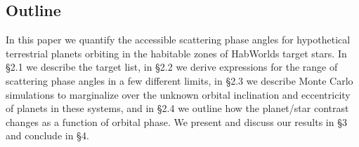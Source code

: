 \documentclass[
    usenatbib,
]{mnras}
\begin{document}




\subsection{Outline}
In this paper we quantify the accessible scattering phase angles for hypothetical terrestrial planets orbiting in the habitable zones of HabWorlds target stars. In \S 2.1 we describe the target list, in \S 2.2 we derive expressions for the range of scattering phase angles in a few different limits, in \S 2.3 we describe Monte Carlo simulations to marginalize over the unknown orbital inclination and eccentricity of planets in these systems, and in \S 2.4 we outline how the planet/star contrast changes as a function of orbital phase.  We present and discuss our results in \S 3 and conclude in \S 4.  %






 
\end{document}
